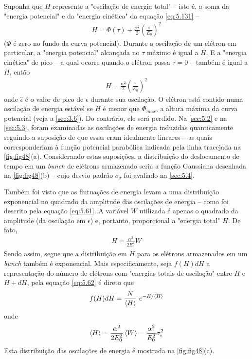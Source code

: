 Suponha que $H$ represente a "oscilação de energia total" -- isto é, a soma da "energia potencial" e da "energia cinética" da equação \eqref{eq:5.131} --
\begin{align}
	H = \Phi(\tau) + \frac{\alpha^2}{2}\left(\frac{\epsilon}{E_0}\right)^2
\end{align}
($\Phi$ é zero no fundo da curva potencial). Durante a oscilação de um elétron em particular, a "energia potencial" alcançada no $\tau$ máximo é igual a $H$. E a "energia cinética" de pico -- a qual ocorre quando o elétron passa $\tau=0$ -- também é igual a $H$, então
\begin{align}
	H = \frac{\alpha^2}{2}\left(\frac{\hat{\epsilon}}{E_0}\right)^2
\end{align}
onde $\hat{\epsilon}$ é o valor de pico de $\epsilon$ durante sua oscilação. O elétron está contido numa oscilação de energia estável se $H$ é menor que $\Phi_{max}$, a altura máxima da curva potencial (veja a \autoref{sec:3.6}). Do contrário, ele será perdido.
 Na \autoref{sec:5.2} e na \autoref{sec:5.3}, foram examinadas as oscilações de energia induzidas quanticamente seguindo a suposição de que essas eram idealmente lineares -- as quais corresponderiam à função potencial parabólica indicada pela linha tracejada na \autoref{fig:fig48}(a). Considerando estas suposições, a distribuição do deslocamento de tempo em um \textit{bunch} de elétrons armazenado seria a função Gaussiana desenhada na \autoref{fig:fig48}(b) -- cujo desvio padrão $\sigma_\tau$ foi avaliado na \autoref{sec:5.4}.
 
Também foi visto que as flutuações de energia levam a uma distribuição exponencial no quadrado da amplitude das oscilações de energia -- como foi descrito pela equação \eqref{eq:5.61}. A variável $W$ utilizada é apenas o quadrado da amplitude (da oscilação em $\epsilon$) e, portanto, proporcional a "energia total" $H$. De fato,
\begin{align}
	H = \frac{\alpha^2}{2E_0^2}W
\end{align}
Sendo assim, segue que a distribuição em $H$ para os elétrons armazenados em um \textit{bunch} também é exponencial. Mais especificamente, seja $f(H)dH$ a representação do número de elétrons com "energias totais de oscilação" entre $H$ e $H+dH$, pela equação \eqref{eq:5.62} é direto que
\begin{align}
	f(H)dH = \frac{N}{\left< H \right>}\ e^{-H/\left< H \right>}
\end{align}
onde
\begin{align}
	\left< H \right> = \frac{\alpha^2}{2E_0^2}\left< W \right> = \frac{\alpha^2}{E_0^2}\sigma_\epsilon^2
\end{align}
Esta distribuição das oscilações de energia é mostrada na \autoref{fig:fig48}(c).

